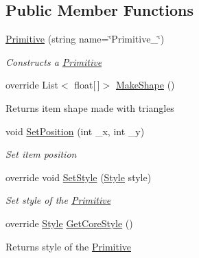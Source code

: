 \subsection*{Public Member Functions}
\begin{DoxyCompactItemize}
\item 
\mbox{\hyperlink{class_space_v_i_l_1_1_primitive_a85367e24ebd62b92a6320e87552b81f9}{Primitive}} (string name=\char`\"{}Primitive\+\_\+\char`\"{})
\begin{DoxyCompactList}\small\item\em Constructs a \mbox{\hyperlink{class_space_v_i_l_1_1_primitive}{Primitive}} \end{DoxyCompactList}\item 
\mbox{\label{class_space_v_i_l_1_1_primitive_a4e7ed3f8d9e28e0063c36f4f2bf470cd}} 
override List$<$ float\mbox{[}$\,$\mbox{]}$>$ \mbox{\hyperlink{class_space_v_i_l_1_1_primitive_a4e7ed3f8d9e28e0063c36f4f2bf470cd}{Make\+Shape}} ()
\begin{DoxyCompactList}\small\item\em \begin{DoxyReturn}{Returns}
item shape made with triangles 
\end{DoxyReturn}
\end{DoxyCompactList}\item 
void \mbox{\hyperlink{class_space_v_i_l_1_1_primitive_a65b7f60596ee1c79c447febdd2e8fdde}{Set\+Position}} (int \+\_\+x, int \+\_\+y)
\begin{DoxyCompactList}\small\item\em Set item position \end{DoxyCompactList}\item 
override void \mbox{\hyperlink{class_space_v_i_l_1_1_primitive_ad2a9fbb75eddf7f36af72385a5453fb2}{Set\+Style}} (\mbox{\hyperlink{class_space_v_i_l_1_1_decorations_1_1_style}{Style}} style)
\begin{DoxyCompactList}\small\item\em Set style of the \mbox{\hyperlink{class_space_v_i_l_1_1_primitive}{Primitive}} \end{DoxyCompactList}\item 
\mbox{\label{class_space_v_i_l_1_1_primitive_ae057ec4be7ceca4cbb29e317201e284d}} 
override \mbox{\hyperlink{class_space_v_i_l_1_1_decorations_1_1_style}{Style}} \mbox{\hyperlink{class_space_v_i_l_1_1_primitive_ae057ec4be7ceca4cbb29e317201e284d}{Get\+Core\+Style}} ()
\begin{DoxyCompactList}\small\item\em \begin{DoxyReturn}{Returns}
style of the \mbox{\hyperlink{class_space_v_i_l_1_1_primitive}{Primitive}} 
\end{DoxyReturn}
\end{DoxyCompactList}\end{DoxyCompactItemize}
